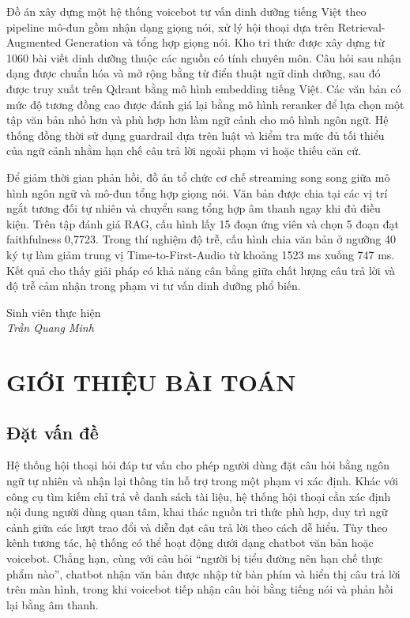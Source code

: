 \documentclass[a4paper,13pt,oneside]{report}
\begin{document}
Đồ án xây dựng một hệ thống voicebot tư vấn dinh dưỡng tiếng Việt theo pipeline mô-đun gồm nhận dạng giọng nói, xử lý hội thoại dựa trên Retrieval-Augmented Generation và tổng hợp giọng nói. Kho tri thức được xây dựng từ 1060 bài viết dinh dưỡng thuộc các nguồn có tính chuyên môn. Câu hỏi sau nhận dạng được chuẩn hóa và mở rộng bằng từ điển thuật ngữ dinh dưỡng, sau đó được truy xuất trên Qdrant bằng mô hình embedding tiếng Việt. Các văn bản có mức độ tương đồng cao được đánh giá lại bằng mô hình reranker để lựa chọn một tập văn bản nhỏ hơn và phù hợp hơn làm ngữ cảnh cho mô hình ngôn ngữ. Hệ thống đồng thời sử dụng guardrail dựa trên luật và kiểm tra mức đủ tối thiểu của ngữ cảnh nhằm hạn chế câu trả lời ngoài phạm vi hoặc thiếu căn cứ.

Để giảm thời gian phản hồi, đồ án tổ chức cơ chế streaming song song giữa mô hình ngôn ngữ và mô-đun tổng hợp giọng nói. Văn bản được chia tại các vị trí ngắt tương đối tự nhiên và chuyển sang tổng hợp âm thanh ngay khi đủ điều kiện. Trên tập đánh giá RAG, cấu hình lấy 15 đoạn ứng viên và chọn 5 đoạn đạt faithfulness 0,7723. Trong thí nghiệm độ trễ, cấu hình chia văn bản ở ngưỡng 40 ký tự làm giảm trung vị Time-to-First-Audio từ khoảng 1523 ms xuống 747 ms. Kết quả cho thấy giải pháp có khả năng cân bằng giữa chất lượng câu trả lời và độ trễ cảm nhận trong phạm vi tư vấn dinh dưỡng phổ biến.

\vspace{0.8cm}
\begin{flushright}
    Sinh viên thực hiện\\[0.2cm]
    \textit{Trần Quang Minh}
\end{flushright}

\newpage
\renewcommand{\contentsname}{MỤC LỤC}
\tableofcontents
\newpage


\chapter{GIỚI THIỆU BÀI TOÁN}

\section{Đặt vấn đề}

Hệ thống hội thoại hỏi đáp tư vấn cho phép người dùng đặt câu hỏi bằng ngôn ngữ tự nhiên và nhận lại thông tin hỗ trợ trong một phạm vi xác định. Khác với công cụ tìm kiếm chỉ trả về danh sách tài liệu, hệ thống hội thoại cần xác định nội dung người dùng quan tâm, khai thác nguồn tri thức phù hợp, duy trì ngữ cảnh giữa các lượt trao đổi và diễn đạt câu trả lời theo cách dễ hiểu. Tùy theo kênh tương tác, hệ thống có thể hoạt động dưới dạng chatbot văn bản hoặc voicebot. Chẳng hạn, cùng với câu hỏi ``người bị tiểu đường nên hạn chế thực phẩm nào'', chatbot nhận văn bản được nhập từ bàn phím và hiển thị câu trả lời trên màn hình, trong khi voicebot tiếp nhận câu hỏi bằng tiếng nói và phản hồi lại bằng âm thanh.
\end{document}
